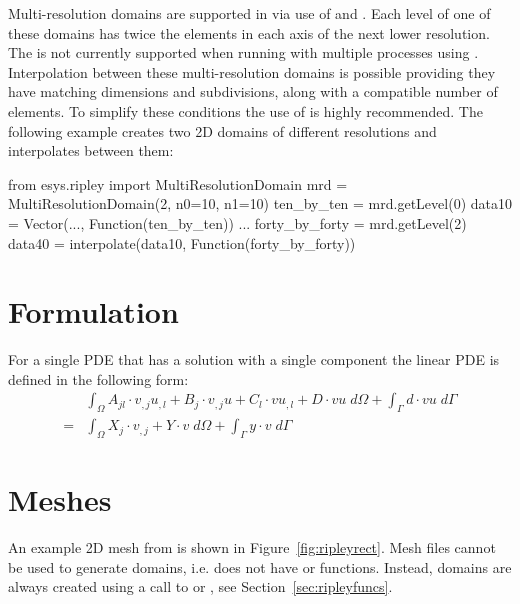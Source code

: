 
Multi-resolution domains are supported in \ripley via use of 
and . Each level of one of
these domains has twice the elements in each axis of the next lower resolution.
The  is not currently supported when running \escript with
multiple processes using \MPI. Interpolation between these multi-resolution
domains is possible providing they have matching dimensions and subdivisions,
along with a compatible number of elements. To simplify these conditions the
use of  is highly recommended. The following
example creates two 2D domains of different resolutions and interpolates
between them:

\begin{python}
 from esys.ripley import MultiResolutionDomain
 mrd = MultiResolutionDomain(2, n0=10, n1=10)
 ten_by_ten = mrd.getLevel(0)
 data10 = Vector(..., Function(ten_by_ten))
 ...
 forty_by_forty = mrd.getLevel(2)
 data40 = interpolate(data10, Function(forty_by_forty))
\end{python}

\section{Formulation}
For a single PDE that has a solution with a single component the linear PDE is
defined in the following form:
\begin{equation}\label{eq:ripleysingle}
\begin{array}{cl} &
\displaystyle{
\int_{\Omega}
A_{jl} \cdot v_{,j}u_{,l}+ B_{j} \cdot v_{,j} u+ C_{l} \cdot v u_{,l}+D \cdot vu \; d\Omega }
+ \displaystyle{\int_{\Gamma} d \cdot vu \; d{\Gamma} }\\
= & \displaystyle{\int_{\Omega}  X_{j} \cdot v_{,j}+ Y \cdot v \; d\Omega }
+ \displaystyle{\int_{\Gamma} y \cdot v \; d{\Gamma}}
\end{array}
\end{equation}

\section{Meshes}
\label{sec:ripleymeshes}
An example 2D mesh from \ripley is shown in Figure~\ref{fig:ripleyrect}.
Mesh files cannot be used to generate \ripley domains, i.e. \ripley does not
have  or  functions.
Instead, \ripley domains are always created using a call to 
or , see Section~\ref{sec:ripleyfuncs}.

